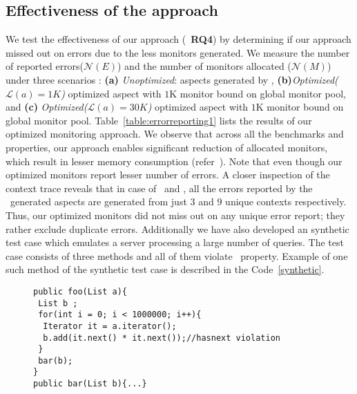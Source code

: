 \subsection{Effectiveness of the approach}
\label{sec:evaluation:effectiveness}


We test the effectiveness of our approach (\ie\ \textbf{RQ4}) by determining 
if our approach missed out on errors due to the less monitors generated. We 
measure the number of reported errors($\mathcal{N}(E)$) and the number of 
monitors allocated ($\mathcal{N}(M)$) under three scenarios : \textbf{(a)}
\emph{Unoptimized}: aspects generated by \javamop, 
\textbf{(b)}\emph{Optimized($\mathcal{L}(a) = 1K$)} optimized aspect with $1$K 
monitor bound on global monitor pool, and \textbf{(c)} 
\emph{Optimized($\mathcal{L}(a) = 30K$)} optimized aspect with $1$K monitor
bound on global monitor pool. Table~\ref{table:errorreporting1} lists the 
results of our optimized monitoring approach. We observe that across all the 
benchmarks and properties, our approach enables significant reduction of 
allocated monitors, which result in lesser memory consumption 
(refer~). Note that even though our optimized 
monitors report lesser number of errors. A closer inspection of the context 
trace reveals that in case of \bloat\ and \avrora, all the errors
reported by the \javamop\ generated aspects are generated from just $3$ and $9$ 
unique contexts respectively. Thus, our optimized monitors did not miss out on 
any unique error report; they rather exclude duplicate errors. Additionally we
have also developed an synthetic test case which emulates a server processing a
large number of queries. The test case consists of three methods and all of them
violate \hasnext\ property. Example of one such method of the synthetic test
case is described in the Code~\ref{synthetic}.

\begin{figure}[h]
\begin{lstlisting}
public foo(List a){
 List b ;
 for(int i = 0; i < 1000000; i++){
  Iterator it = a.iterator();
  b.add(it.next() * it.next());//hasnext violation
 }
 bar(b);
}
public bar(List b){...}
\end{lstlisting}
\end{figure}

